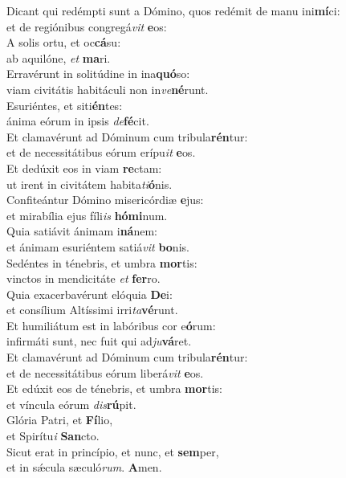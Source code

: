 \evenverse Dicant qui redémpti sunt a Dómino, quos redémit de manu ini\textbf{mí}ci:~\*\\
\evenverse et de regiónibus congregá\textit{vit} \textbf{e}os:\\
\oddverse A solis ortu, et oc\textbf{cá}su:~\*\\
\oddverse ab aquilóne, \textit{et} \textbf{ma}ri.\\
\evenverse Erravérunt in solitúdine in ina\textbf{quó}so:~\*\\
\evenverse viam civitátis habitáculi non in\textit{ve}\textbf{né}runt.\\
\oddverse Esuriéntes, et siti\textbf{én}tes:~\*\\
\oddverse ánima eórum in ipsis \textit{de}\textbf{fé}cit.\\
\evenverse Et clamavérunt ad Dóminum cum tribula\textbf{rén}tur:~\*\\
\evenverse et de necessitátibus eórum erípu\textit{it} \textbf{e}os.\\
\oddverse Et dedúxit eos in viam \textbf{re}ctam:~\*\\
\oddverse ut irent in civitátem habita\textit{ti}\textbf{ó}nis.\\
\evenverse Confiteántur Dómino misericórdiæ \textbf{e}jus:~\*\\
\evenverse et mirabília ejus fíli\textit{is} \textbf{hó}\textbf{mi}num.\\
\oddverse Quia satiávit ánimam i\textbf{ná}nem:~\*\\
\oddverse et ánimam esuriéntem satiá\textit{vit} \textbf{bo}nis.\\
\evenverse Sedéntes in ténebris, et umbra \textbf{mor}tis:~\*\\
\evenverse vinctos in mendicitáte \textit{et} \textbf{fer}ro.\\
\oddverse Quia exacerbavérunt elóquia \textbf{De}i:~\*\\
\oddverse et consílium Altíssimi irri\textit{ta}\textbf{vé}runt.\\
\evenverse Et humiliátum est in labóribus cor e\textbf{ó}rum:~\*\\
\evenverse infirmáti sunt, nec fuit qui ad\textit{ju}\textbf{vá}ret.\\
\oddverse Et clamavérunt ad Dóminum cum tribula\textbf{rén}tur:~\*\\
\oddverse et de necessitátibus eórum liberá\textit{vit} \textbf{e}os.\\
\evenverse Et edúxit eos de ténebris, et umbra \textbf{mor}tis:~\*\\
\evenverse et víncula eórum \textit{dis}\textbf{rú}pit.\\
\oddverse Glória Patri, et \textbf{Fí}lio,~\*\\
\oddverse et Spirítu\textit{i} \textbf{San}cto.\\
\evenverse Sicut erat in princípio, et nunc, et \textbf{sem}per,~\*\\
\evenverse et in sǽcula sæculó\textit{rum}. \textbf{A}men.\\
